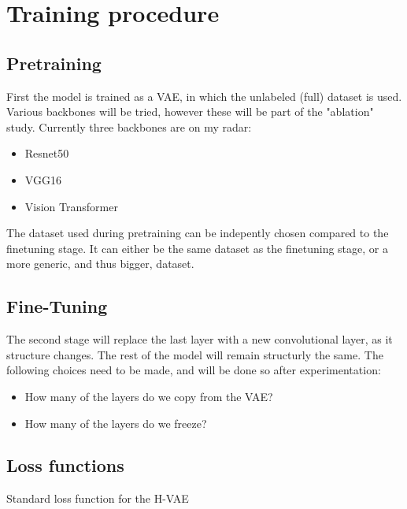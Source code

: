 \section{Training procedure}
\subsection{Pretraining}
First the model is trained as a VAE, in which the unlabeled (full) dataset is used. Various backbones will be tried, however these will be part of the "ablation" study. Currently three backbones are on my radar:
\begin{itemize}
    \item Resnet50 \cite{he2015deep}
    \item VGG16 \cite{simonyan2015deep}
    \item Vision Transformer \cite{dosovitskiy2021image}
\end{itemize}
The dataset used during pretraining can be indepently chosen compared to the finetuning stage. It can either be the same dataset as the finetuning stage, or a more generic, and thus bigger, dataset. 

\subsection{Fine-Tuning}
The second stage will replace the last layer with a new convolutional layer, as it structure changes. The rest of the model will remain structurly the same. The following choices need to be made, and will be done so after experimentation:
\begin{itemize}
    \item How many of the layers do we copy from the VAE?
    \item How many of the layers do we freeze?
\end{itemize}


\subsection{Loss functions}
Standard loss function for the H-VAE

